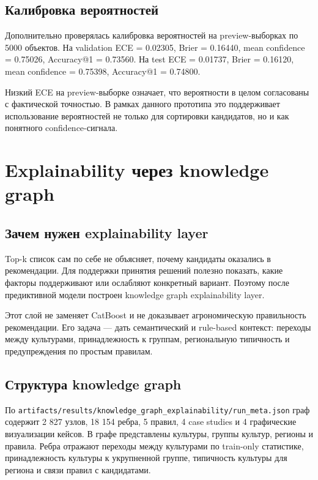 \documentclass[a4paper,article,14pt]{extarticle}
\begin{document}
\subsection{Калибровка вероятностей}

Дополнительно проверялась калибровка вероятностей на preview-выборках по 5000 объектов. На validation ECE = 0.02305, Brier = 0.16440, mean confidence = 0.75026, Accuracy@1 = 0.73560. На test ECE = 0.01737, Brier = 0.16120, mean confidence = 0.75398, Accuracy@1 = 0.74800.

Низкий ECE на preview-выборке означает, что вероятности в целом согласованы с фактической точностью. В рамках данного прототипа это поддерживает использование вероятностей не только для сортировки кандидатов, но и как понятного confidence-сигнала.

\section{Explainability через knowledge graph}

\subsection{Зачем нужен explainability layer}

Top-k список сам по себе не объясняет, почему кандидаты оказались в рекомендации. Для поддержки принятия решений полезно показать, какие факторы поддерживают или ослабляют конкретный вариант. Поэтому после предиктивной модели построен knowledge graph explainability layer.

Этот слой не заменяет CatBoost и не доказывает агрономическую правильность рекомендации. Его задача --- дать семантический и rule-based контекст: переходы между культурами, принадлежность к группам, региональную типичность и предупреждения по простым правилам.

\subsection{Структура knowledge graph}

По \texttt{artifacts/results/knowledge\_graph\_explainability/run\_meta.json} граф содержит 2 827 узлов, 18 154 ребра, 5 правил, 4 case studies и 4 графические визуализации кейсов. В графе представлены культуры, группы культур, регионы и правила. Ребра отражают переходы между культурами по train-only статистике, принадлежность культуры к укрупненной группе, типичность культуры для региона и связи правил с кандидатами.
\end{document}
